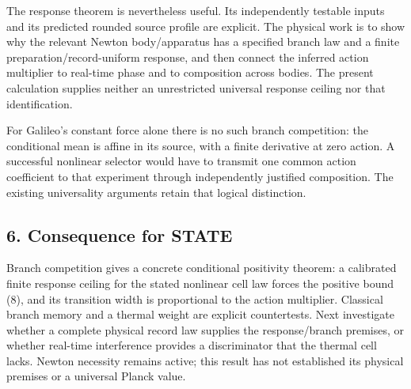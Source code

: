 \documentclass[11pt,a4paper]{article}
\begin{document}
The response theorem is nevertheless useful. Its independently testable
inputs and its predicted rounded source profile are explicit. The
physical work is to show why the relevant Newton body/apparatus has a
specified branch law and a finite preparation/record-uniform response,
and then connect the inferred action multiplier to real-time phase and
to composition across bodies. The present calculation supplies neither
an unrestricted universal response ceiling nor that identification.

For Galileo's constant force alone there is no such branch competition:
the conditional mean is affine in its source, with a finite derivative
at zero action. A successful nonlinear selector would have to transmit
one common action coefficient to that experiment through independently
justified composition. The existing universality arguments retain that
logical distinction.

\subsection{6. Consequence for STATE}\label{consequence-for-state}

Branch competition gives a concrete conditional positivity theorem: a
calibrated finite response ceiling for the stated nonlinear cell law
forces the positive bound (8), and its transition width is proportional
to the action multiplier. Classical branch memory and a thermal weight
are explicit countertests. Next investigate whether a complete physical
record law supplies the response/branch premises, or whether real-time
interference provides a discriminator that the thermal cell lacks.
Newton necessity remains active; this result has not established its
physical premises or a universal Planck value.
\end{document}
